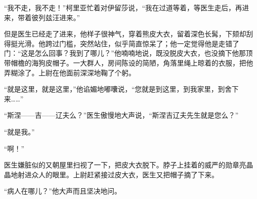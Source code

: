 \par “我不走，我不走！”柯里亚忙着对伊留莎说，“我在过道等着，等医生走后，再进来，带着彼列兹汪进来。”
\par 但是医生已经走了进来，他样子很神气，穿着熊皮大衣，留着深色长髯，下颏却刮得挺光滑。他跨过门槛，突然站住，似乎简直惊呆了；他一定觉得他是走错了门：“这是怎么回事？我到了哪儿？”他喃喃地说，既没脱皮大衣，也没摘下他那顶带帽檐的海狗皮帽子。一大群人，房间陈设的简陋，角落里绳上晾着的衣服，把他弄糊涂了。上尉在他面前深深地鞠了个躬。
\par “就是这里，就是这里，”他谄媚地嘟囔说，“您就是到这里，到我家里，到舍下来……”
\par “斯涅——吉——辽夫么？”医生傲慢地大声说，“斯涅吉辽夫先生就是您么？”
\par “就是我。”
\par “啊！”
\par 医生嫌脏似的又朝屋里扫视了一下，把皮大衣脱下。脖子上挂着的威严的勋章亮晶晶地射进众人的眼里。上尉赶紧接过皮大衣，医生又把帽子摘了下来。
\par “病人在哪儿？”他大声而且坚决地问。
